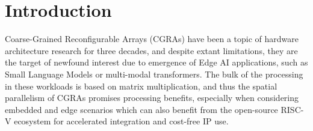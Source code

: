\documentclass[runningheads]{llncs}
\begin{document}
\section{Introduction}
%
%

Coarse-Grained Reconfigurable Arrays (CGRAs) have been a topic of hardware architecture research for three decades, and despite extant limitations, they are the target of newfound interest due to emergence of Edge AI applications, such as Small Language Models or multi-modal transformers. The bulk of the processing in these workloads is based on matrix multiplication, and thus the spatial parallelism of CGRAs promises processing benefits, especially when considering embedded and edge scenarios which can also benefit from the open-source RISC-V ecosystem for accelerated integration and cost-free IP use.

\end{document}
